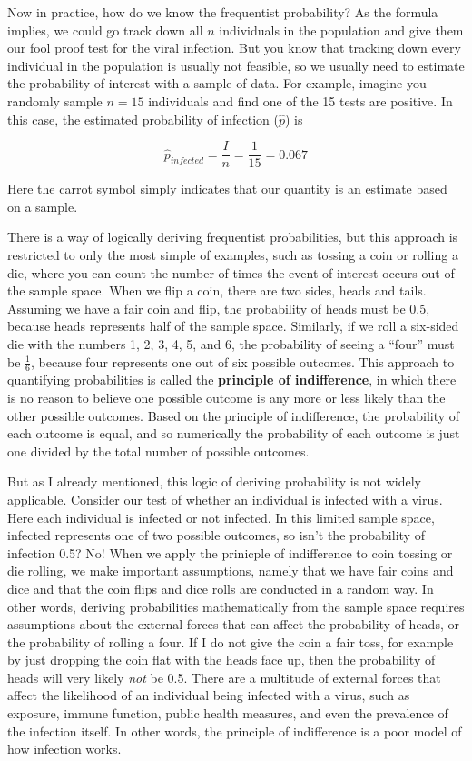 \documentclass[
]{book}
\begin{document}
Now in practice, how do we know the frequentist probability? As the formula implies, we could go track down all \(n\) individuals in the population and give them our fool proof test for the viral infection. But you know that tracking down every individual in the population is usually not feasible, so we usually need to estimate the probability of interest with a sample of data. For example, imagine you randomly sample \(n = 15\) individuals and find one of the 15 tests are positive. In this case, the estimated probability of infection (\(\hat{p}\)) is

\[
\hat{p}_{infected} = \frac{I}{n} = \frac{1}{15}=0.067
\]

Here the carrot symbol simply indicates that our quantity is an estimate based on a sample.

There is a way of logically deriving frequentist probabilities, but this approach is restricted to only the most simple of examples, such as tossing a coin or rolling a die, where you can count the number of times the event of interest occurs out of the sample space. When we flip a coin, there are two sides, heads and tails. Assuming we have a fair coin and flip, the probability of heads must be 0.5, because heads represents half of the sample space. Similarly, if we roll a six-sided die with the numbers 1, 2, 3, 4, 5, and 6, the probability of seeing a ``four'' must be \(\frac{1}{6}\), because four represents one out of six possible outcomes. This approach to quantifying probabilities is called the \textbf{principle of indifference}, in which there is no reason to believe one possible outcome is any more or less likely than the other possible outcomes. Based on the principle of indifference, the probability of each outcome is equal, and so numerically the probability of each outcome is just one divided by the total number of possible outcomes.

But as I already mentioned, this logic of deriving probability is not widely applicable. Consider our test of whether an individual is infected with a virus. Here each individual is infected or not infected. In this limited sample space, infected represents one of two possible outcomes, so isn't the probability of infection 0.5? No! When we apply the prinicple of indifference to coin tossing or die rolling, we make important assumptions, namely that we have fair coins and dice and that the coin flips and dice rolls are conducted in a random way. In other words, deriving probabilities mathematically from the sample space requires assumptions about the external forces that can affect the probability of heads, or the probability of rolling a four. If I do not give the coin a fair toss, for example by just dropping the coin flat with the heads face up, then the probability of heads will very likely \emph{not} be 0.5. There are a multitude of external forces that affect the likelihood of an individual being infected with a virus, such as exposure, immune function, public health measures, and even the prevalence of the infection itself. In other words, the principle of indifference is a poor model of how infection works.
\end{document}

